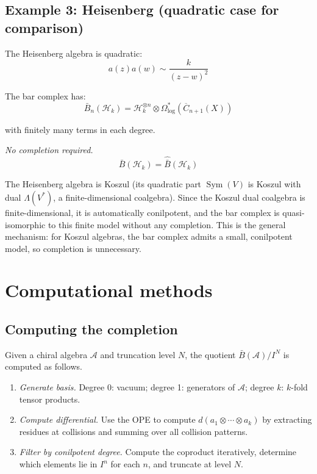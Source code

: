 \subsection{Example 3: Heisenberg (quadratic case for comparison)}

\begin{example}\label{ex:heisenberg-no-completion}
The Heisenberg algebra is quadratic:
\[a(z)a(w) \sim \frac{k}{(z-w)^2}\]

The bar complex has:
\[\bar{B}_n(\mathcal{H}_k) = \mathcal{H}_k^{\otimes n} \otimes \Omega^*_{\log}(\overline{C}_{n+1}(X))\]

with finitely many terms in each degree.

\emph{No completion required.}
\[\bar{B}(\mathcal{H}_k) = \widehat{\bar{B}}(\mathcal{H}_k)\]

The Heisenberg algebra is Koszul (its quadratic part $\operatorname{Sym}(V)$ is
Koszul with dual $\Lambda(V^*)$, a finite-dimensional coalgebra).
Since the Koszul dual coalgebra is finite-dimensional, it is automatically
conilpotent, and the bar complex is quasi-isomorphic to this finite model
without any completion.  This is the general mechanism: for Koszul algebras, the
bar complex admits a small, conilpotent model, so completion is unnecessary.
\end{example}

\section{Computational methods}

\subsection{Computing the completion}

\begin{remark}\label{alg:compute-completion}
Given a chiral algebra $\mathcal{A}$ and truncation level $N$, the quotient $\bar{B}(\mathcal{A})/I^N$ is computed as follows.
\begin{enumerate}
\item \emph{Generate basis.} Degree 0: vacuum; degree 1: generators of $\mathcal{A}$; degree $k$: $k$-fold tensor products.
\item \emph{Compute differential.} Use the OPE to compute $d(a_1 \otimes \cdots \otimes a_k)$ by extracting residues at collisions and summing over all collision patterns.
\item \emph{Filter by conilpotent degree.} Compute the coproduct iteratively, determine which elements lie in $I^n$ for each $n$, and truncate at level $N$.
\end{enumerate}
\end{remark}

